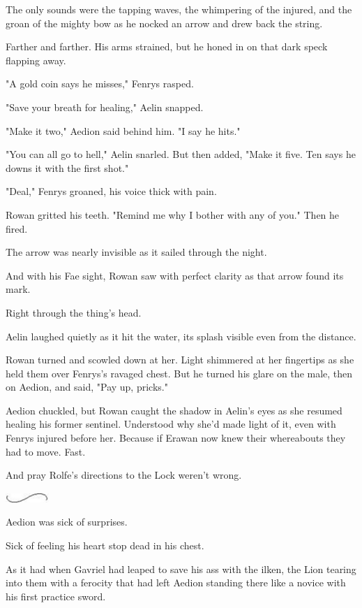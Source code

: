 The only sounds were the tapping waves, the whimpering of the injured, and the groan of the mighty bow as he nocked an arrow and drew back the string.

Farther and farther. His arms strained, but he honed in on that dark speck flapping away.

"A gold coin says he misses," Fenrys rasped.

"Save your breath for healing," Aelin snapped.

"Make it two," Aedion said behind him. "I say he hits."

"You can all go to hell," Aelin snarled. But then added, "Make it five. Ten says he downs it with the first shot."

"Deal," Fenrys groaned, his voice thick with pain.

Rowan gritted his teeth. "Remind me why I bother with any of you." Then he fired.

The arrow was nearly invisible as it sailed through the night.

And with his Fae sight, Rowan saw with perfect clarity as that arrow found its mark.

Right through the thing's head.

Aelin laughed quietly as it hit the water, its splash visible even from the distance.

Rowan turned and scowled down at her. Light shimmered at her fingertips as she held them over Fenrys's ravaged chest. But he turned his glare on the male, then on Aedion, and said, "Pay up, pricks."

Aedion chuckled, but Rowan caught the shadow in Aelin's eyes as she resumed healing his former sentinel. Understood why she'd made light of it, even with Fenrys injured before her. Because if Erawan now knew their whereabouts  they had to move. Fast.

And pray Rolfe's directions to the Lock weren't wrong.

\includegraphics[width=0.65in,height=0.13in]{images/seperator}

Aedion was sick of surprises.

Sick of feeling his heart stop dead in his chest.

As it had when Gavriel had leaped to save his ass with the ilken, the Lion tearing into them with a ferocity that had left Aedion standing there like a novice with his first practice sword.

